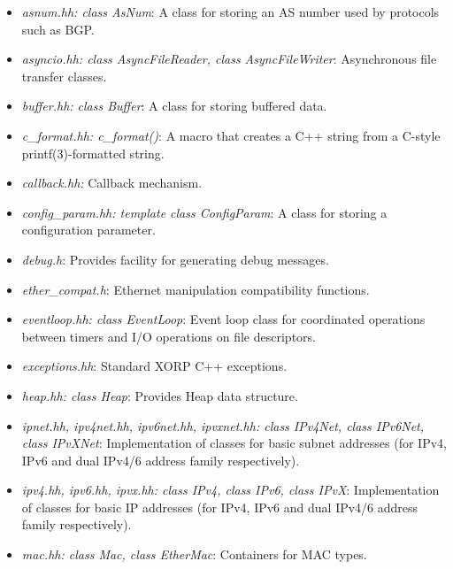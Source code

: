 \documentclass[11pt]{article}
\begin{document}
\begin{itemize}

  \item \emph{asnum.hh: class AsNum}: A class for storing an AS number
  used by protocols such as BGP.

  \item \emph{asyncio.hh: class AsyncFileReader, class AsyncFileWriter}:
  Asynchronous file transfer classes.

  \item \emph{buffer.hh: class Buffer}:  A class for storing buffered
  data.

  \item \emph{c\_format.hh: c\_format()}: A macro that creates a C++ string
  from a C-style printf(3)-formatted string.

  \item \emph{callback.hh:} Callback mechanism.

  \item \emph{config\_param.hh: template class ConfigParam}: A class for
  storing a configuration parameter.

  \item \emph{debug.h}: Provides facility for generating debug messages.

  \item \emph{ether\_compat.h}: Ethernet manipulation compatibility functions.

  \item \emph{eventloop.hh: class EventLoop}: Event loop class for
  coordinated operations between timers and I/O operations on file
  descriptors.

  \item \emph{exceptions.hh}: Standard XORP C++ exceptions.

  \item \emph{heap.hh: class Heap}: Provides Heap data structure.

  \item \emph{ipnet.hh, ipv4net.hh, ipv6net.hh, ipvxnet.hh: class
  IPv4Net, class IPv6Net, class IPvXNet}: Implementation of classes for
  basic subnet addresses (for IPv4, IPv6 and dual IPv4/6 address family
  respectively).

  \item \emph{ipv4.hh, ipv6.hh, ipvx.hh: class
  IPv4, class IPv6, class IPvX}: Implementation of classes for
  basic IP addresses (for IPv4, IPv6 and dual IPv4/6 address family
  respectively).

  \item \emph{mac.hh: class Mac, class EtherMac}: Containers for
  MAC types.


\end{itemize}
\end{document}
